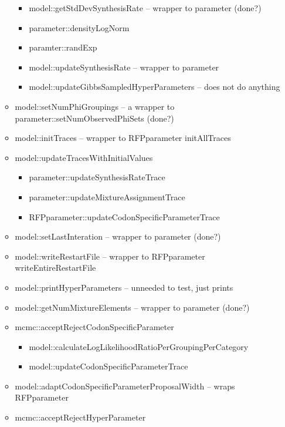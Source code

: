 \documentclass[12pt,hyperref]{labbook}
\newcommand{\sep}{\discretionary{}{}{}} %
\begin{document}
\begin{itemize}
\begin{itemize}
\begin{itemize}
            \item model::getStdDevSynthesisRate -- wrapper to parameter (done?)
            \item parameter::densityLogNorm
            \item paramter::randExp
            \item model::updateSynthesisRate -- wrapper to parameter
            \item model::updateGibbsSampledHyperParameters -- does not do anything
        \end{itemize}
        \item model::\sep set\sep Num\sep Phi\sep Groupings -- 
        a wrapper to parameter::\sep set\sep Num\sep Observed\sep Phi\sep Sets (done?)
        \item model::initTraces -- wrapper to RFPparameter initAllTraces
        \item model::updateTracesWithInitialValues
        \begin{itemize}
            \item parameter::updateSynthesisRateTrace
            \item parameter::updateMixtureAssignmentTrace
            \item RFPparameter::updateCodonSpecificParameterTrace
        \end{itemize}
        \item model::setLastInteration -- wrapper to parameter (done?)
        \item model::writeRestartFile -- wrapper to RFPparameter writeEntireRestartFile
        \item model::printHyperParameters -- unneeded to test, just prints
        \item model::getNumMixtureElements -- wrapper to parameter (done?)
        \item mcmc::acceptRejectCodonSpecificParameter
        \begin{itemize}
            \item model::calculateLogLikelihoodRatioPerGroupingPerCategory
            \item model::updateCodonSpecificParameterTrace
        \end{itemize}
        \item model::\sep adapt\sep Codon\sep Specific\sep Parameter\sep Proposal\sep Width 
        -- wraps RFP\sep parameter
        \item mcmc::acceptRejectHyperParameter
        \begin{itemize}

\end{itemize}
\end{itemize}
\end{itemize}
\end{document}
